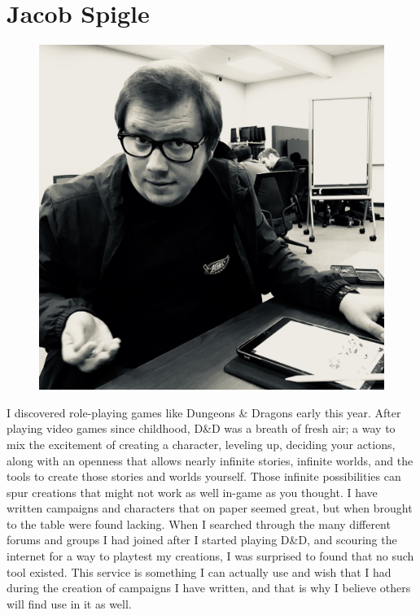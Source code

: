 \documentclass[12pt,a4paper]{report}
\begin{document}
	\section{Jacob Spigle}
	\begin{figure}
		\includegraphics[scale=0.05]{Jacob_Spigle}
	\end{figure}
	I discovered role-playing games like Dungeons \& Dragons early this year. After playing video games since childhood, D\&D was a breath of fresh air; a way to mix the excitement of creating a character, leveling up, deciding your actions, along with an openness that allows nearly infinite stories, infinite worlds, and the tools to create those stories and worlds yourself. Those infinite possibilities can spur creations that might not work as well in-game as you thought. I have written campaigns and characters that on paper seemed great, but when brought to the table were found lacking. When I searched through the many different forums and groups I had joined after I started playing D\&D, and scouring the internet for a way to playtest my creations, I was surprised to found that no such tool existed. This service is something I can actually use and wish that I had during the creation of campaigns I have written, and that is why I believe others will find use in it as well.
	
\end{document}
